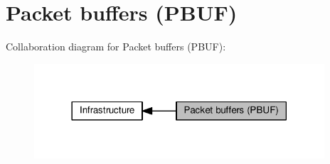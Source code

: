 \hypertarget{group__pbuf}{}\section{Packet buffers (P\+B\+UF)}
\label{group__pbuf}
Collaboration diagram for Packet buffers (P\+B\+UF)\+:
\nopagebreak
\begin{figure}[H]
\begin{center}
\leavevmode
\includegraphics[width=306pt]{group__pbuf}
\end{center}
\end{figure}
